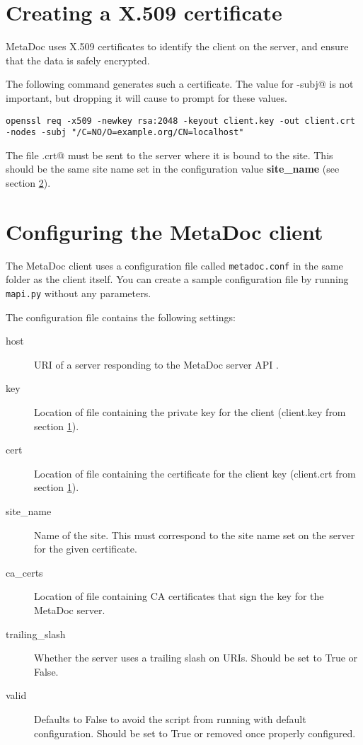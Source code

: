 \documentclass[titlepage, a4paper,10pt]{article}
\begin{document}
\section{Creating a X.509 certificate}
\label{sec:cert_gen}
MetaDoc uses X.509 certificates to identify the client on the server, and
ensure that the data is safely encrypted. 

The following command generates such a certificate. The value for \verb@-subj@
is not important, but dropping it will cause \verb@openssl@ to prompt for these
values.

\begin{verbatim}
openssl req -x509 -newkey rsa:2048 -keyout client.key -out client.crt 
-nodes -subj "/C=NO/O=example.org/CN=localhost"
\end{verbatim}

The file \verb@client.crt@ must be sent to the server where it is bound to the
site. This should be the same site name set in the configuration value
\textbf{site\_name} (see section \ref{sec:config}).

\section{Configuring the MetaDoc client}
\label{sec:config}
The MetaDoc client uses a configuration file called \texttt{metadoc.conf} in
the same folder as the client itself. You can create a sample configuration
file by running \texttt{mapi.py} without any parameters. 

The configuration file contains the following settings:

\begin{description}
    \item[host] URI of a server responding to the MetaDoc server API
        \cite{mdoc}.
    \item[key]  Location of file containing the private key for the client
    (client.key from section \ref{sec:cert_gen}).
    \item[cert] Location of file containing the certificate for the client key
    (client.crt from section \ref{sec:cert_gen}).
    \item[site\_name]   Name of the site. This must correspond to the site name
        set on the server for the given certificate.
    \item[ca\_certs]    Location of file containing CA certificates that sign
        the key for the MetaDoc server.
    \item[trailing\_slash]   Whether the server uses a trailing slash on URIs.
        Should be set to True or False.
    \item[valid]    Defaults to False to avoid the script from running with
        default configuration. Should be set to True or removed once properly
        configured.
\end{description}
\end{document}
